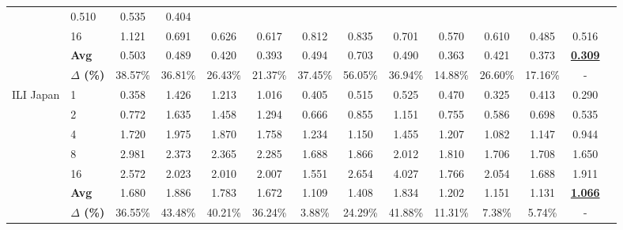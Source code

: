 \begin{table*}[t]
{\begin{tabular}{llcccccccccccc}
              & \cellcolor{low3}0.510 & 0.535 & \cellcolor{low1}0.404 \\[2pt]
        & 16 & 1.121 & 0.691 & 0.626 & 0.617 
              & 0.812 & 0.835 & 0.701 & \cellcolor{low3}0.570 
              & 0.610 & \cellcolor{low1}0.485 & \cellcolor{low2}0.516 \\[2pt]
        & \textbf{Avg} 
          & 0.503 & 0.489 & 0.420 & \cellcolor{low3}0.393 
          & 0.494 & 0.703 & 0.490 & \cellcolor{low2}0.363 
          & 0.421 & 0.373 & \cellcolor{low1}\textbf{\underline{0.309}} \\
        & \textbf{$\Delta$ (\%)} 
          & 38.57\% & 36.81\% & 26.43\% & 21.37\% & 37.45\% 
          & 56.05\% & 36.94\% & 14.88\% & 26.60\% & 17.16\% & - \\
    \midrule        
    \multirow{7}{*}{ILI Japan} 
        & 1  
          & \cellcolor{low3}0.358 & 1.426 & 1.213 & 1.016 
          & 0.405 & 0.515 & 0.525 & 0.470 
          & \cellcolor{low2}0.325 & 0.413 & \cellcolor{low1}0.290 \\[2pt]
        & 2  
          & 0.772 & 1.635 & 1.458 & 1.294 
          & \cellcolor{low3}0.666 & 0.855 & 1.151 & 0.755 
          & \cellcolor{low2}0.586 & 0.698 & \cellcolor{low1}0.535 \\[2pt]
        & 4  
          & 1.720 & 1.975 & 1.870 & 1.758 
          & 1.234 & \cellcolor{low3}1.150 & 1.455 & 1.207 
          & \cellcolor{low2}1.082 & 1.147 & \cellcolor{low1}0.944 \\[2pt]
        & 8  
          & 2.981 & 2.373 & 2.365 & 2.285 
          & \cellcolor{low2}1.688 & 1.866 & 2.012 & 1.810 
          & \cellcolor{low3}1.706 & 1.708 & \cellcolor{low1}1.650 \\[2pt]
        & 16 
          & 2.572 & 2.023 & 2.010 & 2.007 
          & \cellcolor{low1}1.551 & 2.654 & 4.027 & \cellcolor{low3}1.766 
          & 2.054 & \cellcolor{low2}1.688 & 1.911 \\[2pt]
        & \textbf{Avg} 
          & 1.680 & 1.886 & 1.783 & 1.672 
          & \cellcolor{low2}1.109 & 1.408 & 1.834 & 1.202 
          & 1.151 & \cellcolor{low3}1.131 & \cellcolor{low1}\textbf{\underline{1.066}} \\
        & \textbf{$\Delta$ (\%)} 
          & 36.55\% & 43.48\% & 40.21\% & 36.24\% & 3.88\% 
          & 24.29\% & 41.88\% & 11.31\% & 7.38\% & 5.74\% & - \\

\end{tabular}}
\end{table*}
